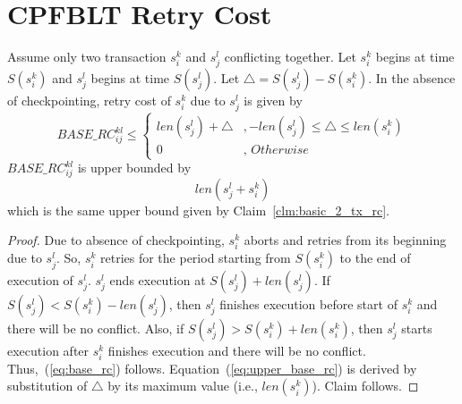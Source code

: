 \section{CPFBLT Retry Cost}\label{sec:cpfblt rc}

\begin{clm}\label{clm:basic_rc}
Assume only two transaction $s_i^k$ and $s_j^l$ conflicting together. Let $s_i^k$ begins at time $S\left(s_i^k\right)$ and $s_j^l$ begins at time $S\left(s_j^l\right)$. Let $\triangle=S\left(s_j^l\right)-S\left(s_i^k\right)$. In the absence of checkpointing, retry cost of $s_i^k$ due to $s_j^l$ is given by
%
\begin{equation}
BASE\_RC_{ij}^{kl} \le \begin{cases}
len\left(s_{j}^{l}\right)+\triangle & ,-len\left(s_{j}^{l}\right)\le\triangle\le len\left(s_{i}^{k}\right)\\
0 & ,\, Otherwise
\end{cases}
\label{eq:base_rc}
\end{equation}
%
$BASE\_RC_{ij}^{kl}$ is upper bounded by 
\begin{equation}
len\left(s_j^l+s_i^k\right)\label{eq:upper_base_rc}
\end{equation}
%
which is the same upper bound given by Claim~\ref{clm:basic_2_tx_rc}.
\end{clm}
%
\begin{proof}
Due to absence of checkpointing, $s_i^k$ aborts and retries from its beginning due to $s_j^l$. So, $s_i^k$ retries for the period starting from $S\left(s_i^k\right)$ to the end of execution of $s_j^l$. $s_j^l$ ends execution at $S\left(s_j^l\right)+len\left(s_j^l\right)$. If $S\left(s_j^l\right)<S\left(s_i^k\right)-len\left(s_j^l\right)$, then $s_j^l$ finishes execution before start of $s_i^k$ and there will be no conflict. Also, if $S\left(s_j^l\right)>S\left(s_i^k\right)+len\left(s_i^k\right)$, then $s_j^l$ starts execution after $s_i^k$ finishes execution and there will be no conflict. Thus,~(\ref{eq:base_rc}) follows. Equation~(\ref{eq:upper_base_rc}) is derived by substitution of $\triangle$ by its maximum value (i.e., $len\left(s_{i}^{k}\right)$). Claim follows.
\end{proof}
%
